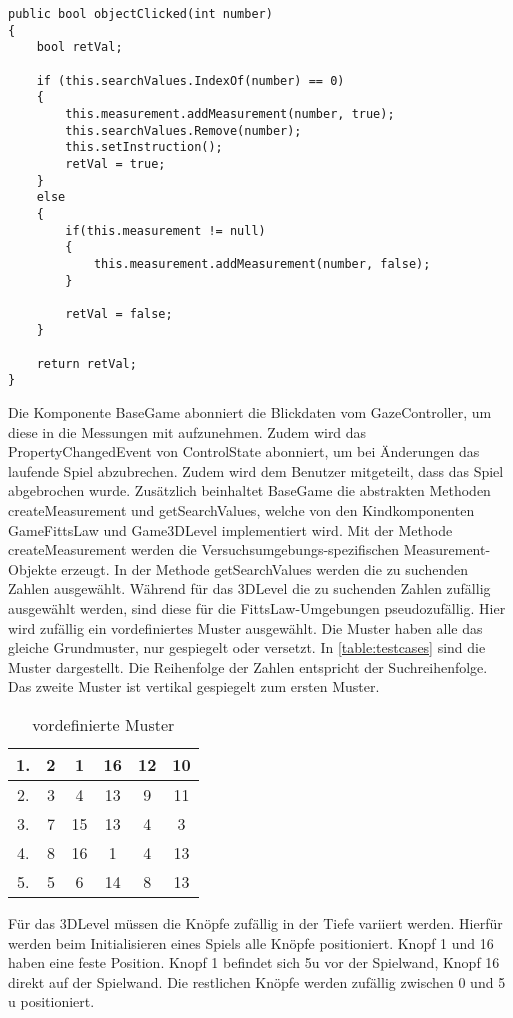 \begin{lstlisting}[caption=Methode objectClicked,label=lstlisting:objectClicked,float=!htbp]
public bool objectClicked(int number)
{
	bool retVal;
	
	if (this.searchValues.IndexOf(number) == 0)
	{
		this.measurement.addMeasurement(number, true);
		this.searchValues.Remove(number);
		this.setInstruction();
		retVal = true;
	}
	else
	{
		if(this.measurement != null)
		{
			this.measurement.addMeasurement(number, false);
		}
	
		retVal = false;
	}
	
	return retVal;
}
\end{lstlisting}

Die Komponente BaseGame abonniert die Blickdaten vom {\ttfamily GazeController}, um diese in die Messungen mit aufzunehmen. Zudem wird das {\ttfamily PropertyChangedEvent} von ControlState abonniert, um bei Änderungen das laufende Spiel abzubrechen. Zudem wird dem Benutzer mitgeteilt, dass das Spiel abgebrochen wurde. Zusätzlich beinhaltet {\ttfamily BaseGame} die abstrakten Methoden {\ttfamily createMeasurement} und {\ttfamily getSearchValues}, welche von den Kindkomponenten {\ttfamily GameFittsLaw} und {\ttfamily Game3DLevel} implementiert wird. Mit der Methode {\ttfamily createMeasurement} werden die Versuchsumgebungs-spezifischen Measurement-Objekte erzeugt. In der Methode {\ttfamily getSearchValues} werden die zu suchenden Zahlen ausgewählt. Während für das 3DLevel die zu suchenden Zahlen zufällig ausgewählt werden, sind diese für die FittsLaw-Umgebungen pseudozufällig. Hier wird zufällig ein vordefiniertes Muster ausgewählt. Die Muster haben alle das gleiche Grundmuster, nur gespiegelt oder versetzt. In \autoref{table:testcases} sind die Muster dargestellt. Die Reihenfolge der Zahlen entspricht der Suchreihenfolge. Das zweite Muster ist vertikal gespiegelt zum ersten Muster. 

\begin{table}[!htbp]
	\centering
	\caption{vordefinierte Muster}
	\label{table:testcases}
	\begin{tabular}{|c ||c c c c c|} 
		\hline
		1. & 2 & 1 & 16 & 12 & 10 \\ 
		\hline
		2. & 3 & 4 & 13 & 9 & 11 \\
		\hline
		3. & 7 & 15 & 13 & 4 & 3 \\
		\hline
		4. & 8 & 16 & 1 & 4 & 13 \\
		\hline
		5. & 5 & 6 & 14 & 8 & 13 \\
		\hline
	\end{tabular}
\end{table}

Für das 3DLevel müssen die Knöpfe zufällig in der Tiefe variiert werden. Hierfür werden beim Initialisieren eines Spiels alle Knöpfe positioniert. Knopf 1 und 16 haben eine feste Position. Knopf 1 befindet sich 5\ac{u} vor der Spielwand, Knopf 16 direkt auf der Spielwand. Die restlichen Knöpfe werden zufällig zwischen 0 und 5 \ac{u} positioniert.